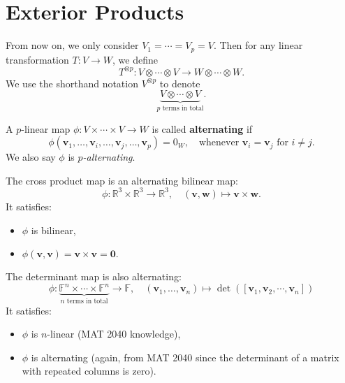 \section{Exterior Products}
From now on, we only consider \( V_1 = \cdots = V_p = V \).  
Then for any linear transformation \( T : V \to W \), we define
\[
T^{\otimes p} : V \otimes \cdots \otimes V \to W \otimes \cdots \otimes W.
\]
We use the shorthand notation \( V^{\otimes p} \) to denote
\[
\underbrace{V \otimes \cdots \otimes V}_{\text{$p$ terms in total}}.
\]
\begin{definition}
A $p$-linear map $\phi : V \times \cdots \times V \to W$ is called \textbf{alternating} if
\[
\phi(\mathbf{v}_1, \ldots, \mathbf{v}_i, \ldots, \mathbf{v}_j, \ldots, \mathbf{v}_p) = 0_W, \quad \text{whenever } \mathbf{v}_i = \mathbf{v}_j \text{ for } i \neq j.
\]
We also say $\phi$ is \emph{$p$-alternating}.
\end{definition}

\begin{example}
The cross product map is an alternating bilinear map:
\[
\phi : \mathbb{R}^3 \times \mathbb{R}^3 \to \mathbb{R}^3, \quad (\mathbf{v}, \mathbf{w}) \mapsto \mathbf{v} \times \mathbf{w}.
\]
It satisfies:
\begin{itemize}
  \item $\phi$ is bilinear,
  \item $\phi(\mathbf{v}, \mathbf{v}) = \mathbf{v} \times \mathbf{v} = \mathbf{0}.$
\end{itemize}
\end{example}

\begin{example}
The determinant map is also alternating:
\[
\phi : \underbrace{\mathbb{F}^n \times \cdots \times \mathbb{F}^n}_{\text{$n$ terms in total}} \to \mathbb{F}, \quad (\mathbf{v}_1, \ldots, \mathbf{v}_n) \mapsto \det([\mathbf{v}_1, \mathbf{v}_2, \cdots, \mathbf{v}_n])
\]
It satisfies:
\begin{itemize}
  \item $\phi$ is $n$-linear (MAT 2040 knowledge),
  \item $\phi$ is alternating (again, from MAT 2040 since the determinant of a matrix with repeated columns is zero).
\end{itemize}
\end{example}

